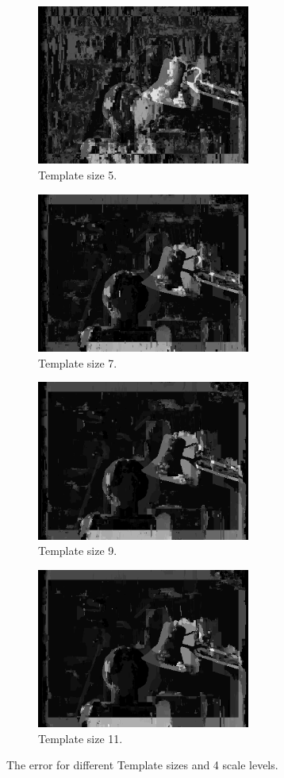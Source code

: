 \documentclass[12pt,a4paper,oneside,final]{article}
\begin{document}
	\begin{figure}[H]
		\centering
		\begin{subfigure}[b]{0.5\textwidth}
			\centering
			\includegraphics[width=7cm]{err_s4_k5set_1.png}
			\caption{Template size 5.}
		\end{subfigure}%
		\begin{subfigure}[b]{0.5\textwidth}
			\centering
			\includegraphics[width=7cm]{err_s4_k7set_1.png}
			\caption{Template size 7.}
		\end{subfigure}
		\begin{subfigure}[b]{0.5\textwidth}
			\centering
			\includegraphics[width=7cm]{err_s4_k9set_1.png}
			\caption{Template size 9.}
		\end{subfigure}%
		\begin{subfigure}[b]{0.5\textwidth}
			\centering
			\includegraphics[width=7cm]{err_s4_k11set_1.png}
			\caption{Template size 11.}
		\end{subfigure}
		\caption{The error for different Template sizes and 4 scale levels.}
		\label{fig:error}
	\end{figure}
	
\end{document}

